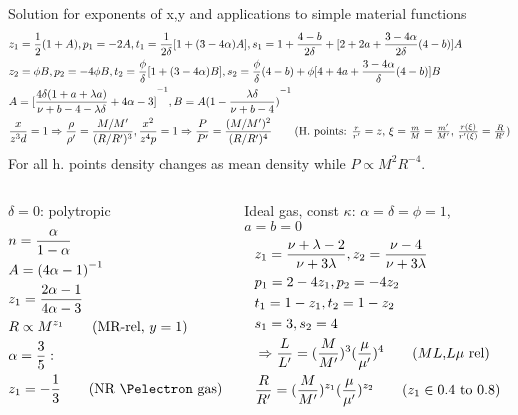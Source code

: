\begin{frame}{Solution for exponents of x,y and applications to simple material functions}
    \begin{align*}
            &z_1=\frac{1}{2}(1+A),p_1=-2A,t_1=\frac{1}{2\delta}[1+(3-4\alpha)A],s_1=1+\frac{4-b}{2\delta}+[2+2a+\frac{3-4\alpha}{2\delta}(4-b)]A\\
            &z_2=\phi B,p_2=-4\phi B,t_2=\frac{\phi}{\delta}[1+(3-4\alpha)B],s_2=\frac{\phi}{\delta}(4-b)+\phi[4+4a+\frac{3-4\alpha}{\delta}(4-b)]B\\
            &A=\invers{[\frac{4\delta(1+a+\lambda a)}{\nu+b-4-\lambda\delta}+4\alpha-3]},B=A\invers{(1-\frac{\lambda\delta}{\nu+b-4})}\\
            &\frac{x}{z^3d}=1\Rightarrow \frac{\rho}{\rho'}=\frac{M/M'}{(R/R')^3},\frac{x^2}{z^4p}=1\Rightarrow \frac{P}{P'}=\frac{(M/M')^2}{(R/R')^4}\tag{H. points: $\frac{r}{r'}=z$, $\xi=\frac{m}{M}=\frac{m'}{M'}$, $\frac{r(\xi)}{r'(\xi)}=\frac{R}{R'}$}
    \end{align*}
For all h. points density changes as mean density while $P\propto M^2R^{-4}$.
\begin{columns}[T]
    \begin{column}{0.3\textwidth}
        \begin{block}{$\delta=0$: polytropic}
            \begin{align*}
                &n=\frac{\alpha}{1-\alpha}\\
                &A=\invers{(4\alpha-1)}\\
                &z_1=\frac{2\alpha-1}{4\alpha-3}\\
                &R\propto M^{z_1}\tag{MR-rel, $y=1$}\\
                &\alpha=\frac{3}{5}:\\
                &z_1=-\frac{1}{3}\tag{NR \Pelectron gas}
            \end{align*}
        \end{block}
    \end{column}
    \begin{column}{0.38\textwidth}
        \begin{block}{Ideal gas, const $\kappa$: $\alpha=\delta=\phi=1$, $a=b=0$}
            \begin{align*}
                &z_1=\frac{\nu+\lambda-2}{\nu+3\lambda},z_2=\frac{\nu-4}{\nu+3\lambda}\\
                &p_1=2-4z_1,p_2=-4z_2\\
                &t_1=1-z_1,t_2=1-z_2\\
                &s_1=3,s_2=4\\
                &\Rightarrow \frac{L}{L'}=(\frac{M}{M'})^3(\frac{\mu}{\mu'})^4\tag{$ML$,$L\mu$ rel}\\
                &\frac{R}{R'}=(\frac{M}{M'})^{z_1}(\frac{\mu}{\mu'})^{z_2}\tag{$z_1\in\numrange{0.4}{0.8}$}
            \end{align*}


\end{block}
\end{column}
\end{columns}
\end{frame}
